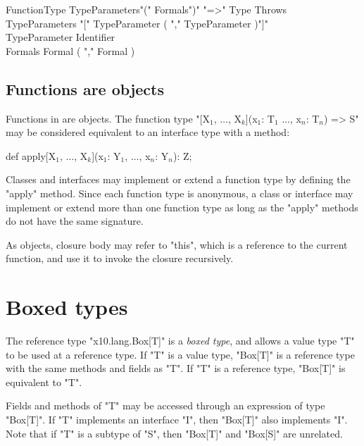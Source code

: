 \begin{grammar}
FunctionType \: TypeParameters\opt \xcd"(" Formals\opt \xcd")"
\xcd"=>" Type Throws\opt \\
TypeParameters \: \xcd"[" TypeParameter ( \xcd"," TypeParameter
)\star \xcd"]" \\
TypeParameter \: Identifier \\
Formals \: Formal ( \xcd"," Formal )\star \\
\end{grammar}

\subsection{Functions are objects}
\label{FunctionsAreObjects}

Functions in \Xten{} are objects.  
The function type
\xcdmath"[X$_1$, $\dots$, X$_k$](x$_1$: T$_1$ $\dots$, x$_n$: T$_n$) => S"
may be considered equivalent to an interface type
with a method:
\begin{xtenmath}
def apply[X$_1$, $\dots$, X$_k$](x$_1$: Y$_1$, $\dots$, x$_n$: Y$_n$): Z;
\end{xtenmath}
Classes and interfaces may implement or extend a function type
by defining the \xcd"apply" method.  Since each function type is 
anonymous, a class or interface may implement or extend
more than one function type as long as the \xcd"apply" methods
do not have the same signature.

As objects, closure body may refer to
\xcd"this", which is a reference to the current function,
and use it to invoke the closure recursively.

\section{Boxed types}
\label{BoxedTypes}
\label{BoxType}


The reference type \xcd"x10.lang.Box[T]" is a \emph{boxed type},
and allows a value type \xcd"T" to be used at a
reference type.
%
If \xcd"T" is a value type, \xcd"Box[T]" is a reference type
with the same methods and fields as \xcd"T".
If \xcd"T" is a reference type, \xcd"Box[T]" is equivalent to
\xcd"T".

Fields and methods of \xcd"T" may be accessed through an
expression of type \xcd"Box[T]".
If \xcd"T" implements an interface \xcd"I", then
\xcd"Box[T]" also implements \xcd"I". 
Note that if \xcd"T" is a subtype of \xcd"S",
then \xcd"Box[T]" and \xcd"Box[S]" are unrelated.

